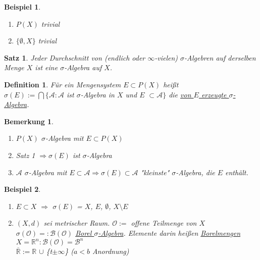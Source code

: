 \documentclass[11pt]{memoir}
\theoremstyle{changebreak}
\newtheorem{Definition}{Definition}[chapter]
\newtheorem{Bemerkung}{Bemerkung}[chapter]
\newtheorem{Beispiel}{Beispiel}[chapter]
\newtheorem{Satz}{Satz}[chapter]
\begin{document}
\begin{Beispiel}
\begin{enumerate}
	\item $P(X)$ trivial
	\item $\{ \emptyset, X \}${} trivial
\end{enumerate}
\end{Beispiel}

\begin{Satz}
Jeder Durchschnitt von (endlich oder $\infty$-vielen) $\sigma$-Algebren auf derselben Menge $X$ ist eine $\sigma$-Algebra auf $X$.
\end{Satz}

\begin{Definition}
Für ein Mengensystem $E \subset P(X)$ heißt \\
$\sigma(E):=\bigcap \{ \mathscr{A}: \mathscr{A}$ ist $\sigma$-Algebra in $X$ und $E$ $\subset \mathscr{A} \}$ die \underline{von $E$ erzeugte $\sigma$-Algebra}.
\end{Definition}

\begin{Bemerkung}
\begin{enumerate}
	\item $P(X)$ $\sigma$-Algebra mit $E \subset P(X)$
	\item Satz 1 $\Rightarrow \sigma(E)$ ist $\sigma$-Algebra
	\item $\mathscr{A}$ $\sigma$-Algebra mit $E \subset \mathscr{A} \Rightarrow \sigma(E) \subset 		\mathscr{A}$ "kleinste"{} $\sigma$-Algebra, die $E$ enthält.
\end{enumerate}
\end{Bemerkung}

\begin{Beispiel}
\begin{enumerate}
	\item $E \subset X$ $\Rightarrow $ $\sigma(E)$ = \textbraceleft $X$, $E$, $\emptyset$, $X \setminus E$\textbraceright
	\item $(X, d)$ sei metrischer Raum. $\mathscr{O}:=$ \textbraceleft offene Teilmenge von $X$ \\
	$\sigma(\mathscr{O})=:\mathscr{B(O)}$ \underline{Borel $\sigma$-Algebra}. Elemente darin heißen \underline{Borelmengen} \\
	$X = \mathbb{R}^{n}: \mathscr{B(O)} = \mathscr{B}^{n}$ \\
	$\overline{\mathbb{R}} := \mathbb{R}$  $\cup$ \{t$\pm\infty$\} {}($a < b$ Anordnung)
\end{enumerate}
\end{Beispiel}
\end{document}
